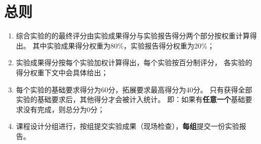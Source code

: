 
\section{总则}
\begin{enumerate}
      \item 综合实验的的最终评分由实验成果得分与实验报告得分两个部分按权重计算得出。
            其中实验成果得分权重为80\%，实验报告得分权重为20\%；
      \item 实验成果得分按每个实验加权计算得出，每个实验按百分制评分，
            各实验的得分权重下文中会具体给出；
      \item 每个实验的基础要求得分为60分，拓展要求最高得分为40分。
            只有获得全部实验的基础要求后，其他得分才会被计入统计。
            即：如果有\textbf{任意一个}基础要求没有完成，则总分为0分；
      \item 课程设计分组进行，按组提交实验成果（现场检查），\textbf{每组}提交一份实验报告。
\end{enumerate}

